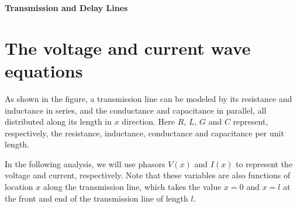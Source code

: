 \usepackage{html}


{\huge \bf Transmission and Delay Lines}

\section*{The voltage and current wave equations}

As shown in the figure, a transmission line can be modeled by its 
resistance and inductance in series, and the conductance and capacitance
in parallel, all distributed along its length in $x$ direction. Here $R$,
$L$, $G$ and $C$ represent, respectively, the resistance, inductance, 
conductance and capacitance per unit length.


In the following analysis, we will use phasors $V(x)$ and $I(x)$ to represent
the voltage and current, respectively. Note that these variables are also
functions of location $x$ along the transmission line, which takes the value
$x=0$ and $x=l$ at the front and end of the transmission line of length $l$.

